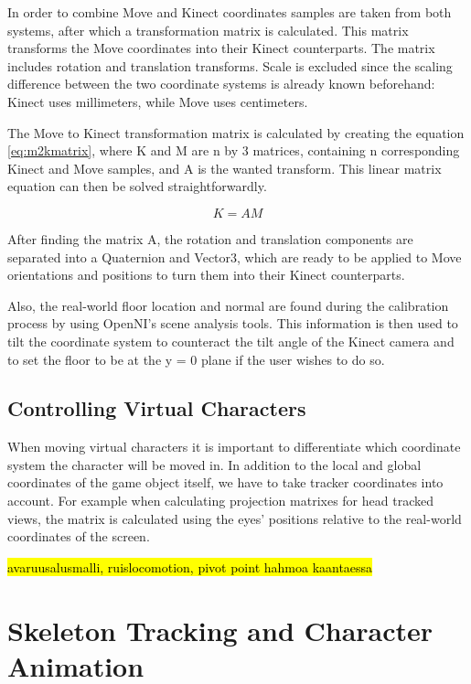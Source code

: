 \documentclass[12pt,a4paper,oneside,pdftex]{report}
\begin{document}
In order to combine Move and Kinect coordinates samples are taken from both systems, after which a transformation matrix is calculated. This matrix transforms the Move coordinates into their Kinect counterparts. The matrix includes rotation and translation transforms. Scale is excluded since the scaling difference between the two coordinate systems is already known beforehand: Kinect uses millimeters, while Move uses centimeters.

The Move to Kinect transformation matrix is calculated by creating the equation \ref{eq:m2kmatrix}, where K and M are n by 3 matrices, containing n corresponding Kinect and Move samples, and A is the wanted transform. This linear matrix equation can then be solved straightforwardly.

\begin{equation}
    K = AM
    \label{eq:m2kmatrix}
\end{equation}

After finding the matrix A, the rotation and translation components are separated into a Quaternion and Vector3, which are ready to be applied to Move orientations and positions to turn them into their Kinect counterparts.

Also, the real-world floor location and normal are found during the calibration process by using OpenNI's scene analysis tools. This information is then used to tilt the coordinate system to counteract the tilt angle of the Kinect camera and to set the floor to be at the y = 0 plane if the user wishes to do so.

\subsection{Controlling Virtual Characters}
\label{subsection:coordinatesystems:virtualcharacters}

When moving virtual characters it is important to differentiate which coordinate system the character will be moved in. In addition to the local and global coordinates of the game object itself, we have to take tracker coordinates into account. For example when calculating projection matrixes for head tracked views, the matrix is calculated using the eyes' positions relative to the real-world coordinates of the screen. 

\hl{avaruusalusmalli, ruislocomotion, pivot point hahmoa kaantaessa}

\section{Skeleton Tracking and Character Animation}
\label{section:skeletontracking}
\end{document}
